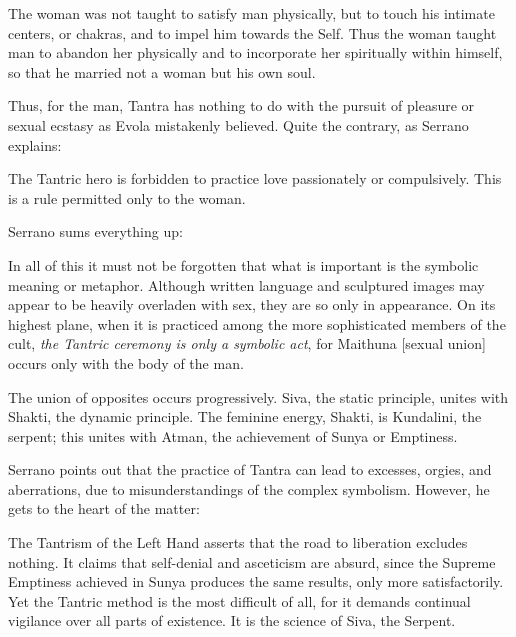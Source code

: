 \begin{quotex}
The woman was not taught to satisfy man physically, but to touch his intimate centers, or chakras, and to impel him towards the Self. Thus the woman taught man to abandon her physically and to incorporate her spiritually within himself, so that he married not a woman but his own soul. 

\end{quotex}
Thus, for the man, Tantra has nothing to do with the pursuit of pleasure or sexual ecstasy as Evola mistakenly believed. Quite the contrary, as Serrano explains:

\begin{quotex}
The Tantric hero is forbidden to practice love passionately or compulsively. This is a rule permitted only to the woman. 

\end{quotex}
Serrano sums everything up:

\begin{quotex}
In all of this it must not be forgotten that what is important is the symbolic meaning or metaphor. Although written language and sculptured images may appear to be heavily overladen with sex, they are so only in appearance. On its highest plane, when it is practiced among the more sophisticated members of the cult, \emph{the Tantric ceremony is only a symbolic act}, for Maithuna [sexual union] occurs only with the body of the man. 

\end{quotex}
The union of opposites occurs progressively. Siva, the static principle, unites with Shakti, the dynamic principle. The feminine energy, Shakti, is Kundalini, the serpent; this unites with Atman, the achievement of Sunya or Emptiness.

Serrano points out that the practice of Tantra can lead to excesses, orgies, and aberrations, due to misunderstandings of the complex symbolism. However, he gets to the heart of the matter:

\begin{quotex}
The Tantrism of the Left Hand asserts that the road to liberation excludes nothing. It claims that self-denial and asceticism are absurd, since the Supreme Emptiness achieved in Sunya produces the same results, only more satisfactorily. Yet the Tantric method is the most difficult of all, for it demands continual vigilance over all parts of existence. It is the science of Siva, the Serpent. 

\end{quotex}

